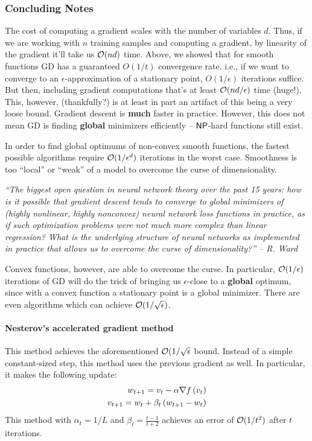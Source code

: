 \subsubsection{Concluding Notes}
The cost of computing a gradient scales with the number of variables $d$. Thus, if we are working with $n$ training samples and computing a gradient, by linearity of the gradient it'll take us $\mathcal{O}(nd)$ time. Above, we showed that for smooth functions GD has a guaranteed $O(1/t)$ convergence rate. i.e., if we want to converge to an $\epsilon$-approximation of a stationary point, $O(1/\epsilon)$ iterations suffice. But then, including gradient computations that's at least $\mathcal{O}(nd/\epsilon)$ time (huge!). This, however, (thankfully?) is at least in part an artifact of this being a very loose bound. Gradient descent is {\bf much} faster in practice. However, this does not mean GD is finding {\bf global} minimizers efficiently -- $\mathsf{NP}$-hard functions still exist.

In order to find global optimums of non-convex smooth functions, the fastest possible algorithms require $\mathcal{O}(1/\epsilon^d)$ iterations in the worst case. Smoothness is too ``local'' or ``weak'' of a model to overcome the curse of dimensionality.
\begin{displayquote}
{\em ``The biggest open question in neural network theory over the past 15 years: how is it possible that gradient descent tends to converge to global minimizers of (highly nonlinear, highly nonconvex) neural network loss functions in practice, as if such optimization problems were not much more complex than linear regression? What is the underlying structure of neural networks as implemented in practice that allows us to overcome the curse of dimensionality?'' -- R. Ward}
\end{displayquote}
Convex functions, however, are able to overcome the curse. In particular, $\mathcal{O}(1/\epsilon)$ iterations of GD will do the trick of bringing us $\epsilon$-close to a {\bf global} optimum, since with a convex function a stationary point is a global minimizer. There are even algorithms which can achieve $\mathcal{O}(1/\sqrt{\epsilon})$.
\paragraph{Nesterov's accelerated gradient method}
This method achieves the aforementioned $\mathcal{O}(1/\sqrt{\epsilon}$ bound. Instead of a simple constant-sized step, this method uses the previous gradient as well. In particular, it makes the following update:
\begin{align*}
    w_{t+1} = v_t - \alpha \nabla f\left( v_t \right) \\
    v_{t+1} = w_t + \beta_t\left( w_{t+1} - w_t \right)
\end{align*}
This method with $\alpha_t = 1/L$ and $\beta_t = \frac{t -1 }{t + 2}$ achieves an error of $\mathcal{O}(1/t^2)$ after $t$ iterations.

